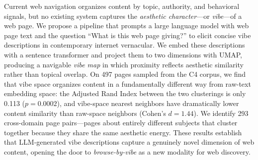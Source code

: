 Current web navigation organizes content by topic, authority, and behavioral signals, but no existing system captures the \emph{aesthetic character}---or \emph{vibe}---of a web page.
We propose a pipeline that prompts a large language model with web page text and the question ``What is this web page giving?'' to elicit concise vibe descriptions in contemporary internet vernacular.
We embed these descriptions with a sentence transformer and project them to two dimensions with UMAP, producing a navigable \emph{vibe map} in which proximity reflects aesthetic similarity rather than topical overlap.
On 497 pages sampled from the C4 corpus, we find that vibe space organizes content in a fundamentally different way from raw-text embedding space: the Adjusted Rand Index between the two clusterings is only 0.113 ($p{=}0.0002$), and vibe-space nearest neighbors have dramatically lower content similarity than raw-space neighbors (Cohen's $d{=}1.44$).
We identify 293 cross-domain page pairs---pages about entirely different subjects that cluster together because they share the same aesthetic energy.
These results establish that LLM-generated vibe descriptions capture a genuinely novel dimension of web content, opening the door to \emph{browse-by-vibe} as a new modality for web discovery.

